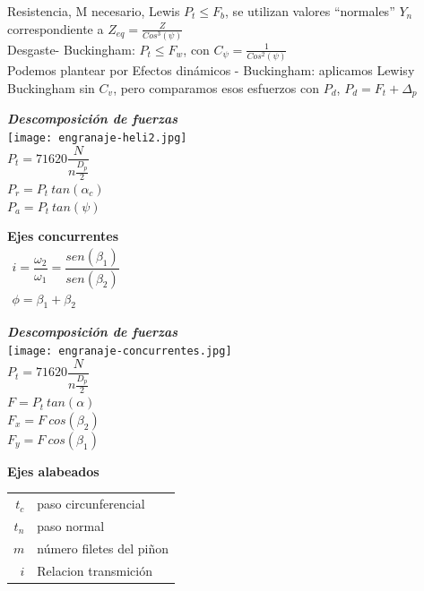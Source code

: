 \documentclass[11pt,a4paper]{article}
\begin{document}
\begin{multicols}{2}
	\textbullet Resistencia, M necesario, Lewis	$P_t\leq F_b$,
	se utilizan valores ``normales'' $Y_n$ correspondiente a $Z_{eq}=\frac{Z}{Cos^{3}(\psi)}$\\


	\textbullet Desgaste- Buckingham: $P_t\leq F_w$, con $C_\psi=\frac{1}{Cos^{2}(\psi)}$ \\

	\textbullet Podemos plantear por Efectos dinámicos - Buckingham: aplicamos Lewisy Buckingham sin $C_v$, pero comparamos esos esfuerzos con $P_d$, $P_d=F_t+\Delta_p$\\

	\begin{multicols}{2}
		\textbf{\textit{Descomposición de fuerzas}}\\
		\texttt{[image: engranaje-heli2.jpg]}\\
		\vfill\columnbreak
		\vspace*{0.8cm}
		$P_t=71620\dfrac{N}{n\frac{D_p}{2}}$\\
		$P_r=P_t~tan(\alpha_c)$\\
		$P_a=P_t~tan(\psi)$
	\end{multicols}



	\newpage
		\textbf{Ejes concurrentes}\\
		$\begin{array}{l}
		i=\dfrac{\omega_2}{\omega_1}=\dfrac{sen(\beta_1)}{sen(\beta_2)}\\
		\phi=\beta_1+\beta_2
		\end{array}$\\

		\begin{multicols}{2}
			\textbf{\textit{Descomposición de fuerzas}}\\
			\texttt{[image: engranaje-concurrentes.jpg]}\\
			\vfill\columnbreak
			\vspace*{0.2cm}
			$P_t=71620\dfrac{N}{n\frac{D_p}{2}}$\\
			$F=P_t~tan(\alpha)$\\
			$F_x=F~cos(\beta_2)$\\
			$F_y=F~cos(\beta_1)$\\
		\end{multicols}
	\vspace*{0.2cm}
	\vfill\columnbreak
		\textbf{Ejes alabeados}\\
		\begin{tabular}{r l}
			$t_c$& paso circunferencial\\
			$t_n$& paso normal\\
			$m$& número filetes del piñon\\
			$i$&		Relacion transmición\\
		\end{tabular}\\


\end{multicols}
\end{document}
